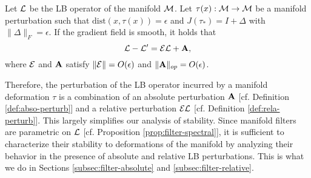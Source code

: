 
\begin{theorem} \label{thm:perturb}
{Let ${\mathcal L}$ be the LB operator of the manifold ${\mathcal M}$.
Let $\tau(x):{\mathcal M}\rightarrow {\ensuremath{\mathcal M}}$ be a manifold perturbation such that $\text{dist}(x,\tau(x))= \epsilon$ and $J(\tau_*)= I+\Delta$ with $\|\Delta\|_F=\epsilon$. If the gradient field is smooth, it holds that}
\begin{equation}
    \label{eqn:perturb-operator}
    {\ensuremath{\mathcal L}}-{\mathcal L}' = {\mathcal E} {\mathcal L} + {\mathbf A} ,
\end{equation}
where ${\mathcal E}$ and ${\mathbf A}$ satisfy $\|{\mathcal E}\|=O(\epsilon)$ and $\|{\mathbf A}\|_{op}= O(\epsilon)$. 
\end{theorem}

Therefore, the perturbation of the LB operator incurred by a manifold deformation $\tau$ is a combination of an absolute perturbation ${\mathbf A}$ [cf. Definition \ref{def:abso-perturb}] and a relative perturbation ${\mathcal E}{\mathcal L}$ [cf. Definition \ref{def:rela-perturb}]. This largely simplifies our analysis of stability. Since manifold filters are parametric on ${\mathcal L}$ [cf. Proposition \ref{prop:filter-spectral}], it is sufficient to characterize their stability to deformations of the manifold by analyzing their behavior in the presence of absolute and relative LB perturbations. This is what we do in Sections \ref{subsec:filter-absolute} and \ref{subsec:filter-relative}.